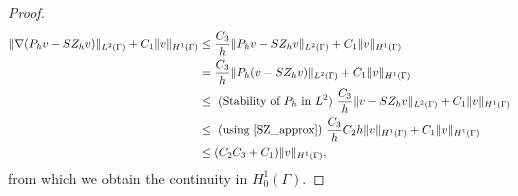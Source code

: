 \begin{proof}
\begin{equation*}
\begin{split}
\|\nabla (P_h v - SZ_h v)\|_{L^2(\Gamma)} + C_1\|v\|_{H^1(\Gamma)}
&\leq \frac{C_3}{h} \|P_h v - SZ_h v\|_{L^2(\Gamma)} + C_1\|v\|_{H^1(\Gamma)}\\
&= \frac{C_3}{h} \|P_h (v - SZ_h v)\|_{L^2(\Gamma)} + C_1\|v\|_{H^1(\Gamma)}\\
&\leq  \text{ (Stability of $P_h$ in $L^2$) } \frac{C_3}{h} \|v - SZ_h v\|_{L^2(\Gamma)} + C_1\|v\|_{H^1(\Gamma)}\\
&\leq \text{ (using \eqref{SZ_approx}) } \frac{C_3}{h} C_2 h  \| v\|_{H^1(\Gamma)} + C_1\|v\|_{H^1(\Gamma)}\\
&\leq (C_2 C_3 +C_1) \|v\|_{H^1(\Gamma)},
\end{split}
\end{equation*}
from which we obtain the continuity in $H^1_0(\Gamma)$.
\end{proof}

